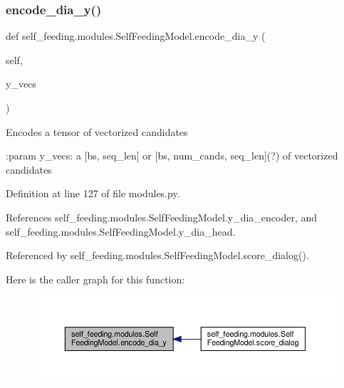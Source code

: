 \mbox{\label{classself__feeding_1_1modules_1_1SelfFeedingModel_a1197eb318b6aeff97f44d89dc397dc1c}} 
\subsubsection{\texorpdfstring{encode\+\_\+dia\+\_\+y()}{encode\_dia\_y()}}
{\footnotesize\ttfamily def self\+\_\+feeding.\+modules.\+Self\+Feeding\+Model.\+encode\+\_\+dia\+\_\+y (\begin{DoxyParamCaption}\item[{}]{self,  }\item[{}]{y\+\_\+vecs }\end{DoxyParamCaption})}

\begin{DoxyVerb}Encodes a tensor of vectorized candidates

:param y_vecs: a [bs, seq_len] or [bs, num_cands, seq_len](?) of vectorized
    candidates
\end{DoxyVerb}
 

Definition at line 127 of file modules.\+py.



References self\+\_\+feeding.\+modules.\+Self\+Feeding\+Model.\+y\+\_\+dia\+\_\+encoder, and self\+\_\+feeding.\+modules.\+Self\+Feeding\+Model.\+y\+\_\+dia\+\_\+head.



Referenced by self\+\_\+feeding.\+modules.\+Self\+Feeding\+Model.\+score\+\_\+dialog().

Here is the caller graph for this function\+:
\nopagebreak
\begin{figure}[H]
\begin{center}
\leavevmode
\includegraphics[width=350pt]{classself__feeding_1_1modules_1_1SelfFeedingModel_a1197eb318b6aeff97f44d89dc397dc1c_icgraph}
\end{center}
\end{figure}
\mbox{\label{classself__feeding_1_1modules_1_1SelfFeedingModel_a5cf9512d33efb28bbe68a9072f15bd64}} 
